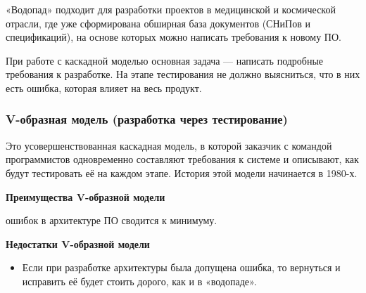 \documentclass[a4paper]{article}
\begin{document}
«Водопад» подходит для разработки проектов в медицинской и космической отрасли, где уже сформирована обширная база документов (СНиПов и спецификаций), на основе которых можно написать требования к новому ПО.

При работе с каскадной моделью основная задача — написать подробные требования к разработке. На этапе тестирования не должно выясниться, что в них есть ошибка, которая влияет на весь продукт.

\subsubsection{V-образная модель (разработка через тестирование)}

Это усовершенствованная каскадная модель, в которой заказчик с командой программистов одновременно составляют требования к системе и описывают, как будут тестировать её на каждом этапе. История этой модели начинается в 1980-х.


\begin{figure}[h]
\end{figure}

\noindent\textbf{Преимущества V-образной модели}
\begin{itemize}
   ошибок в архитектуре ПО сводится к минимуму.
\end{itemize}
\noindent\textbf{Недостатки V-образной модели}
\begin{itemize}
  \item Если при разработке архитектуры была допущена ошибка, то вернуться и исправить её будет стоить дорого, как и в «водопаде».
\end{itemize}
\end{document}
